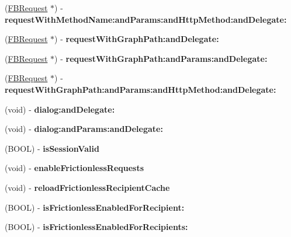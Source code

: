 \begin{DoxyCompactItemize}
\item 
\mbox{\label{interfaceFacebook_a551690540897af3806bf6bb42240e79c}} 
(\hyperlink{interfaceFBRequest}{F\+B\+Request} $\ast$) -\/ {\bfseries request\+With\+Method\+Name\+:and\+Params\+:and\+Http\+Method\+:and\+Delegate\+:}
\item 
\mbox{\label{interfaceFacebook_add6d2aee3e3c0f5eb366fb1365818536}} 
(\hyperlink{interfaceFBRequest}{F\+B\+Request} $\ast$) -\/ {\bfseries request\+With\+Graph\+Path\+:and\+Delegate\+:}
\item 
\mbox{\label{interfaceFacebook_a90435b334434f119cf308a5bdd783478}} 
(\hyperlink{interfaceFBRequest}{F\+B\+Request} $\ast$) -\/ {\bfseries request\+With\+Graph\+Path\+:and\+Params\+:and\+Delegate\+:}
\item 
\mbox{\label{interfaceFacebook_a72ade01e9a6c63eb99de69d3bdc7aafe}} 
(\hyperlink{interfaceFBRequest}{F\+B\+Request} $\ast$) -\/ {\bfseries request\+With\+Graph\+Path\+:and\+Params\+:and\+Http\+Method\+:and\+Delegate\+:}
\item 
\mbox{\label{interfaceFacebook_ad9bd27f4f2a9bc642efe314472f4ddd2}} 
(void) -\/ {\bfseries dialog\+:and\+Delegate\+:}
\item 
\mbox{\label{interfaceFacebook_ace7b7a375e92d9871437e5554c2a46bc}} 
(void) -\/ {\bfseries dialog\+:and\+Params\+:and\+Delegate\+:}
\item 
\mbox{\label{interfaceFacebook_a6178476bc78da9727d4f2b32b9663a9a}} 
(B\+O\+OL) -\/ {\bfseries is\+Session\+Valid}
\item 
\mbox{\label{interfaceFacebook_a719ee4cdc817456c3691de07f47b4096}} 
(void) -\/ {\bfseries enable\+Frictionless\+Requests}
\item 
\mbox{\label{interfaceFacebook_a4637b000788e008fe83b377652fbf1fe}} 
(void) -\/ {\bfseries reload\+Frictionless\+Recipient\+Cache}
\item 
\mbox{\label{interfaceFacebook_a2d6b4db924ce570e4b3e168ee2662dcb}} 
(B\+O\+OL) -\/ {\bfseries is\+Frictionless\+Enabled\+For\+Recipient\+:}
\item 
\mbox{\label{interfaceFacebook_a2c23a238ccb9a2e546ddbd469e0973a4}} 
(B\+O\+OL) -\/ {\bfseries is\+Frictionless\+Enabled\+For\+Recipients\+:}
\end{DoxyCompactItemize}
